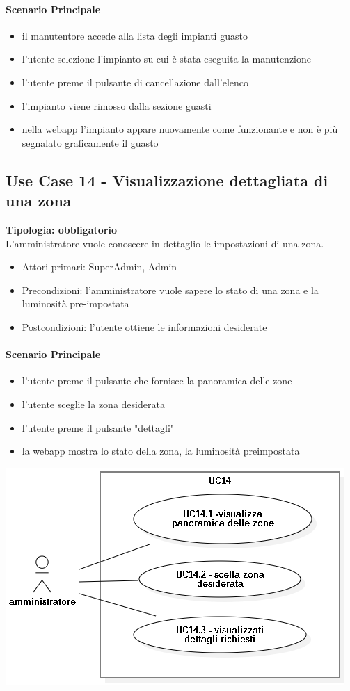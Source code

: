 \documentclass[12pt]{article}
\begin{document}
\paragraph{Scenario Principale}
\begin{itemize}
	\item il manutentore accede alla lista degli impianti guasto
	\item l'utente selezione l'impianto su cui è stata eseguita la manutenzione
	\item l'utente preme il pulsante di cancellazione dall'elenco
	\item l'impianto viene rimosso dalla sezione guasti
	\item nella webapp l'impianto appare nuovamente come funzionante e non è più segnalato graficamente il guasto
\end{itemize}


\subsection{Use Case 14 - Visualizzazione dettagliata di una zona}
\textbf{Tipologia: obbligatorio} \\
L'amministratore vuole conoscere in dettaglio le impostazioni di una zona.
\begin{itemize}
	\item Attori primari: SuperAdmin, Admin
	\item Precondizioni: l'amministratore vuole sapere lo stato di una zona e la luminosità pre-impostata
	\item Postcondizioni: l'utente ottiene le informazioni desiderate
\end{itemize}
\paragraph{Scenario Principale}
\begin{itemize}
	\item l'utente preme il pulsante che fornisce la panoramica delle zone
	\item l'utente sceglie la zona desiderata
	\item l'utente preme il pulsante "dettagli"
	\item la webapp mostra lo stato della zona, la luminosità preimpostata
\end{itemize}

\includegraphics[scale=0.5]{UC14.png}
\end{document}
